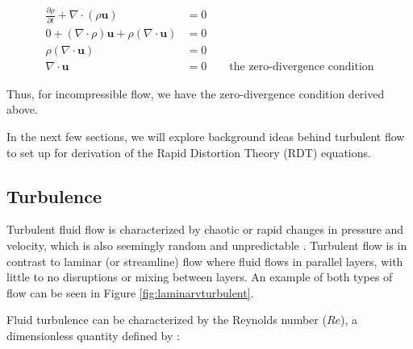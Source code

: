 \documentclass[paper=a4, fontsize=11pt]{scrartcl} %
\numberwithin{equation}{section} %
\numberwithin{figure}{section} %
\numberwithin{table}{section} %
\begin{document}
\begin{align}
    \frac{\partial \rho}{\partial t} + \nabla \cdot \left( \rho \bm{u} \right ) &= 0 \\
    0 + \left (\nabla \cdot \rho \right ) \bm{u} + \rho \left ( \nabla \cdot \bm{u} \right ) &= 0 \\
    \rho \left ( \nabla \cdot \bm{u} \right ) &= 0 \\
    \nabla \cdot \bm{u} &= 0 \qquad \text{the zero-divergence condition}
\end{align}

Thus, for incompressible flow, we have the zero-divergence condition derived above.

\par

In the next few sections, we will explore background ideas behind turbulent flow to set up for derivation of the Rapid Distortion Theory (RDT) equations. 


\subsection{Turbulence}

Turbulent fluid flow is characterized by chaotic or rapid changes in pressure and velocity, which is also seemingly random and unpredictable \cite{pope}.
Turbulent flow is in contrast to laminar (or streamline) flow where fluid flows in parallel layers, 
with little to no disruptions or mixing between layers. An example of both types of flow can be seen in Figure 
\ref{fig:laminarvturbulent}.

Fluid turbulence can be characterized by the Reynolds number ($Re$), a dimensionless quantity defined by \cite{reynoldsnumber}: 
\end{document}
